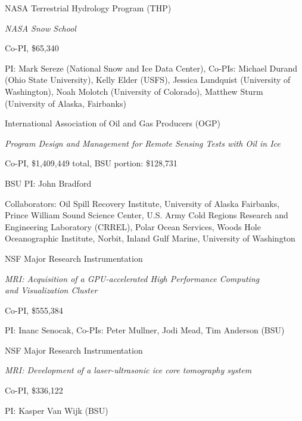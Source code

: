 \documentclass[11pt]{article}
\renewenvironment{itemize}{
  \begin{list}{}{
    \setlength{\leftmargin}{1.5em}
    \setlength{\itemsep}{0pt}
    \setlength{\parskip}{0pt}
  }
}{
  \end{list}
}
\begin{document}
\begin{itemize}
\item[1/2014-12/2014] NASA Terrestrial Hydrology Program (THP)
\begin{itemize}
\item \textit{NASA Snow School}
\item Co-PI, \$65,340
\item PI: Mark Sereze (National Snow and Ice Data Center), Co-PIs: Michael Durand (Ohio State University), Kelly Elder (USFS),
Jessica Lundquist (University of Washington), Noah Molotch (University of Colorado), Matthew Sturm (University of Alaska, Fairbanks)
\end{itemize}

\item[01/2014-12/2014] International Association of Oil and Gas Producers (OGP)
\begin{itemize}
\item \textit{Program Design and Management for Remote Sensing Tests with Oil in Ice}
\item Co-PI, \$1,409,449 total, BSU portion: \$128,731
\item BSU PI: John Bradford
\item Collaborators: Oil Spill Recovery Institute, University of Alaska Fairbanks, Prince William Sound Science Center, U.S. Army Cold Regions Research and Engineering Laboratory (CRREL), Polar Ocean Services, Woods Hole Oceanographic Institute, Norbit, Inland Gulf Marine, University of Washington
\end{itemize}

\item[09/2012-08/2013] NSF Major Research Instrumentation
\begin{itemize}
\item \textit{MRI: Acquisition of a GPU-accelerated High Performance Computing} \\ 
\textit{and Visualization Cluster}
\item Co-PI, \$555,384
\item PI: Inanc Senocak, Co-PIs: Peter Mullner, Jodi Mead, Tim Anderson (BSU)
\end{itemize}

\pagebreak

\item[09/2012-08/2013] NSF Major Research Instrumentation
\begin{itemize}
\item \textit{MRI: Development of a laser-ultrasonic ice core tomography system}
\item Co-PI, \$336,122
\item PI: Kasper Van Wijk (BSU)
\end{itemize}


\end{itemize}
\end{document}
